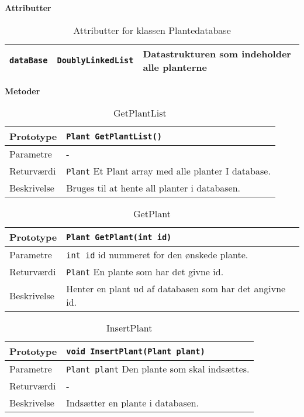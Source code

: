 \textbf{Attributter}

\begin{table}[h]
\begin{tabularx}{\textwidth}{| >{\raggedright\arraybackslash}X | >{\raggedright\arraybackslash}X | >{\raggedright\arraybackslash}p{10 cm} |} \hline
\texttt{dataBase} & \texttt{DoublyLinkedList} & Datastrukturen som indeholder alle planterne \\\hline
\end{tabularx}
\caption{Attributter for klassen Plantedatabase}
\label{table:Plantedatabase_attributter}
\end{table}

\textbf{Metoder}

\begin{table}[h]
\begin{tabularx}{\textwidth}{| >{\raggedright\arraybackslash}p{2.5 cm} | >{\raggedright\arraybackslash}X |} \hline
Prototype & \texttt{Plant GetPlantList()} \\\hline
Parametre & - \\\hline
Returværdi & \texttt{Plant} \newline
Et Plant array med alle planter I database. \\\hline
Beskrivelse & Bruges til at hente all planter i databasen. \\\hline
\end{tabularx}
\caption{GetPlantList}
\label{table:GetPlantList}
\end{table}

\begin{table}[h]
\begin{tabularx}{\textwidth}{| >{\raggedright\arraybackslash}p{2.5 cm} | >{\raggedright\arraybackslash}X |} \hline
Prototype & \texttt{Plant GetPlant(int id)} \\\hline
Parametre & \texttt{int id} \newline
id nummeret for den ønskede plante. \\\hline
Returværdi & \texttt{Plant} \newline
En plante som har det givne id. \\\hline
Beskrivelse & Henter en plant ud af databasen som har det angivne id. \\\hline
\end{tabularx}
\caption{GetPlant}
\label{table:GetPlant}
\end{table}

\begin{table}[h]
\begin{tabularx}{\textwidth}{| >{\raggedright\arraybackslash}p{2.5 cm} | >{\raggedright\arraybackslash}X |} \hline
Prototype & \texttt{void InsertPlant(Plant plant)} \\\hline
Parametre & \texttt{Plant plant} \newline
Den plante som skal indsættes. \\\hline
Returværdi & - \\\hline
Beskrivelse & Indsætter en plante i databasen. \\\hline
\end{tabularx}
\caption{InsertPlant}
\label{table:InsertPlant}
\end{table}

